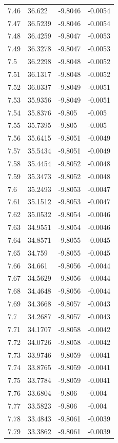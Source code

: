 \begin{tabular}{llll}
7.46 & 36.622 & -9.8046 & -0.0054 \\
7.47 & 36.5239 & -9.8046 & -0.0054 \\
7.48 & 36.4259 & -9.8047 & -0.0053 \\
7.49 & 36.3278 & -9.8047 & -0.0053 \\
7.5 & 36.2298 & -9.8048 & -0.0052 \\
7.51 & 36.1317 & -9.8048 & -0.0052 \\
7.52 & 36.0337 & -9.8049 & -0.0051 \\
7.53 & 35.9356 & -9.8049 & -0.0051 \\
7.54 & 35.8376 & -9.805 & -0.005 \\
7.55 & 35.7395 & -9.805 & -0.005 \\
7.56 & 35.6415 & -9.8051 & -0.0049 \\
7.57 & 35.5434 & -9.8051 & -0.0049 \\
7.58 & 35.4454 & -9.8052 & -0.0048 \\
7.59 & 35.3473 & -9.8052 & -0.0048 \\
7.6 & 35.2493 & -9.8053 & -0.0047 \\
7.61 & 35.1512 & -9.8053 & -0.0047 \\
7.62 & 35.0532 & -9.8054 & -0.0046 \\
7.63 & 34.9551 & -9.8054 & -0.0046 \\
7.64 & 34.8571 & -9.8055 & -0.0045 \\
7.65 & 34.759 & -9.8055 & -0.0045 \\
7.66 & 34.661 & -9.8056 & -0.0044 \\
7.67 & 34.5629 & -9.8056 & -0.0044 \\
7.68 & 34.4648 & -9.8056 & -0.0044 \\
7.69 & 34.3668 & -9.8057 & -0.0043 \\
7.7 & 34.2687 & -9.8057 & -0.0043 \\
7.71 & 34.1707 & -9.8058 & -0.0042 \\
7.72 & 34.0726 & -9.8058 & -0.0042 \\
7.73 & 33.9746 & -9.8059 & -0.0041 \\
7.74 & 33.8765 & -9.8059 & -0.0041 \\
7.75 & 33.7784 & -9.8059 & -0.0041 \\
7.76 & 33.6804 & -9.806 & -0.004 \\
7.77 & 33.5823 & -9.806 & -0.004 \\
7.78 & 33.4843 & -9.8061 & -0.0039 \\
7.79 & 33.3862 & -9.8061 & -0.0039 \\

\end{tabular}
